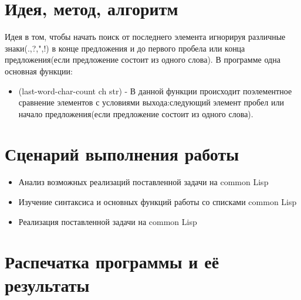 \documentclass[12pt]{article}
\begin{document}
\section{Идея, метод, алгоритм}
Идея в том, чтобы начать поиск от последнего элемента игнорируя различные знаки(.,?,",!) в конце предложения и до первого пробела или конца предложения(если предложение состоит из одного слова). В программе одна основная функции:
\begin{itemize}
\setlength{\itemsep}{-1mm} %
\item (last-word-char-count ch str) - В данной функции происходит поэлементное сравнение элементов с условиями выхода:следующий элемент пробел или начало предложения(если предложение состоит из одного слова).
\end{itemize}

\section{Сценарий выполнения работы}
\begin{itemize}
\setlength{\itemsep}{-1mm}
\item Анализ возможных реализаций поставленной задачи на common Lisp
\item Изучение синтаксиса и основных функций работы со списками common Lisp
\item Реализация поставленной задачи на common Lisp
\end{itemize}
\section{Распечатка программы и её результаты}
\end{document}
